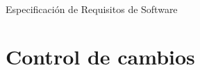 \documentclass[12pt]{article}
\title{\nombredelproyecto}
\author{Alejandro Barrachina Argudo \\
David Cantador Piedras \\
Rodrigo Sosa Sáez \\
Juan Pantaleón Femenía Quevedo \\
David Llanes Martín \\
Sergio Sánchez Chamizo  \\
Samuel Rodríguez Moreno \\
Rodrigo Souto Santos
}
\date{\today}
\begin{document}
\begin{titlepage}
    \makeatletter
    {
        \centering
        \vspace*{4cm}
        {\fontsize{40pt}{40pt}\scshape\textbf{\@title}\par}


        {\Huge Especificación de Requisitos de Software\par}

        \vspace*{1cm}
        {\Large\itshape
            \@author
            \par}
    }
    \vfill
    \makeatother
\end{titlepage}
\newpage

\section*{Control de cambios} %
\end{document}
